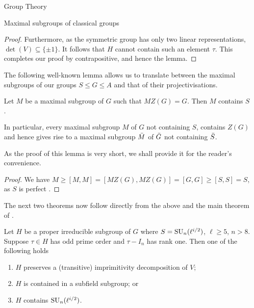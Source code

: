 \documentclass[11pt,a4paper]{article}
\begin{document}
\begin{section}{Group Theory}
\begin{subsection}{Maximal subgroups of classical groups}
\begin{proof}
Furthermore, as the symmetric group has only two linear representations, $\det(V) \subseteq \{\pm 1 \}$.
It follows that $H$ cannot contain such an element $\tau$.
This completes our proof by contrapositive, and hence the lemma.
\end{proof}

The following well-known lemma allows us to translate between the maximal subgroups of our groups $S \leq G \leq A$ and that of their projectivisations.


\begin{lemma}
Let $M$ be a maximal subgroup of $G$ such that $MZ(G)=G$. Then $M$ contains $S$.

In particular, every maximal subgroup $M$ of $G$ not containing $S$, contains $Z(G)$ and hence gives rise to a maximal subgroup $\Bar{M}$ of $\Bar{G}$ not containing $\Bar{S}$.
\end{lemma}

As the proof of this lemma is very short, we shall provide it for the reader's convenience.

\begin{proof}
    We have $M \geq [M,M] = [MZ(G),MZ(G)] = [G,G] \geq [S,S] = S$, as $S$ is perfect \cite[Thm. 1.7, Prop. 3.7, Thm. 11.22]{Grove}.
\end{proof}

The next two theorems now follow directly from the above and the main theorem of \cite{KleidmanLiebeck}. 

\begin{theorem}
\label{thm_maximal_sbgps_GU}
Let $H$ be a proper irreducible subgroup of $G$ where $S = \SU_n(\ell^{i/2})$, $\ell \geq 5$, $n > 8$. Suppose $\tau \in H$ has odd prime order and $\tau-I_n$ has rank one. Then one of the following holds
\begin{enumerate}
    \item $H$ preserves a (transitive) imprimitivity decomposition of $V$;
    \item $H$ is contained in a subfield subgroup; or 
    \item $H$ contains $\SU_n(\ell^{i/2})$.
\end{enumerate}
\end{theorem}



\end{subsection}
\end{section}
\end{document}
